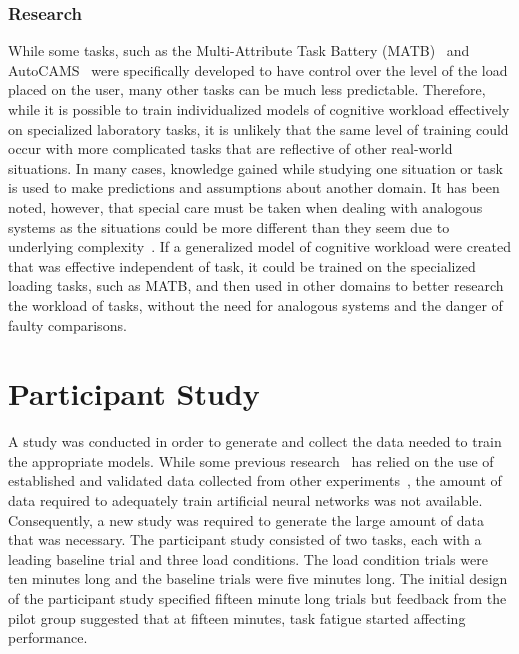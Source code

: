 \documentclass[11pt]{article}
\begin{document}
		
		\subsubsection{Research}
		While some tasks, such as the Multi-Attribute Task Battery (MATB)~\cite{Comstock} and AutoCAMS~\cite{Lorenz} were specifically developed to have control over the level of the load placed on the user, many other tasks can be much less predictable. Therefore, while it is possible to train individualized models of cognitive workload effectively on specialized laboratory tasks, it is unlikely that the same level of training could occur with more complicated tasks that are reflective of other real-world situations. In many cases, knowledge gained while studying one situation or task is used to make predictions and assumptions about another domain. It has been noted, however, that special care must be taken when dealing with analogous systems as the situations could be more different than they seem due to underlying complexity~\cite{Huey}. If a generalized model of cognitive workload were created that was effective independent of task, it could be trained on the specialized loading tasks, such as MATB, and then used in other domains to better research the workload of tasks, without the need for analogous systems and the danger of faulty comparisons.
		

\section{Participant Study}
A study was conducted in order to generate and collect the data needed to train the appropriate models. While some previous research~\cite{Wang_Z} has relied on the use of established and validated data collected from other experiments~\cite{Wilson_2010}, the amount of data required to adequately train artificial neural networks was not available. Consequently, a new study was required to generate the large amount of data that was necessary. The participant study consisted of two tasks, each with a leading baseline trial and three load conditions. The load condition trials were ten minutes long and the baseline trials were five minutes long. 
The initial design of the participant study specified fifteen minute long trials but feedback from the pilot group suggested that at fifteen minutes, task fatigue started affecting performance.
\end{document}
